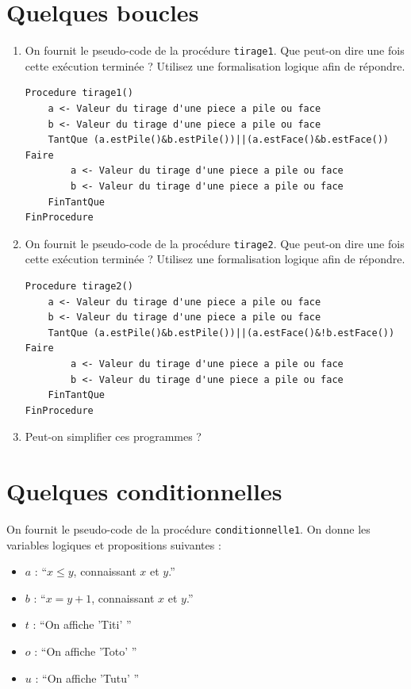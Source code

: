\documentclass[a4paper,11pt]{article}
\begin{document}
\section{Quelques boucles}

\begin{enumerate}
\item On fournit le pseudo-code de la procédure \texttt{tirage1}. Que peut-on dire une fois cette exécution terminée ? Utilisez une formalisation logique afin de répondre.

\begin{lstlisting}
Procedure tirage1()
    a <- Valeur du tirage d'une piece a pile ou face
    b <- Valeur du tirage d'une piece a pile ou face
    TantQue (a.estPile()&b.estPile())||(a.estFace()&b.estFace()) Faire
        a <- Valeur du tirage d'une piece a pile ou face
        b <- Valeur du tirage d'une piece a pile ou face
    FinTantQue
FinProcedure
\end{lstlisting}

\item On fournit le pseudo-code de la procédure \texttt{tirage2}. Que peut-on dire une fois cette exécution terminée ? Utilisez une formalisation logique afin de répondre.

\begin{lstlisting}
Procedure tirage2()
    a <- Valeur du tirage d'une piece a pile ou face
    b <- Valeur du tirage d'une piece a pile ou face
    TantQue (a.estPile()&b.estPile())||(a.estFace()&!b.estFace()) Faire
        a <- Valeur du tirage d'une piece a pile ou face
        b <- Valeur du tirage d'une piece a pile ou face
    FinTantQue
FinProcedure
\end{lstlisting}

\item Peut-on simplifier ces programmes ?
\end{enumerate}

\section{Quelques conditionnelles}

On fournit le pseudo-code de la procédure \texttt{conditionnelle1}. On donne les variables logiques et propositions suivantes :
\begin{itemize}
\item $a$ : ``$x \leq y$, connaissant $x$ et $y$.''
\item $b$ : ``$x = y + 1$, connaissant $x$ et $y$.''
\item $t$ : ``On affiche 'Titi' ''
\item $o$ : ``On affiche 'Toto' ''
\item $u$ : ``On affiche 'Tutu' ''
\end{itemize}
\end{document}
